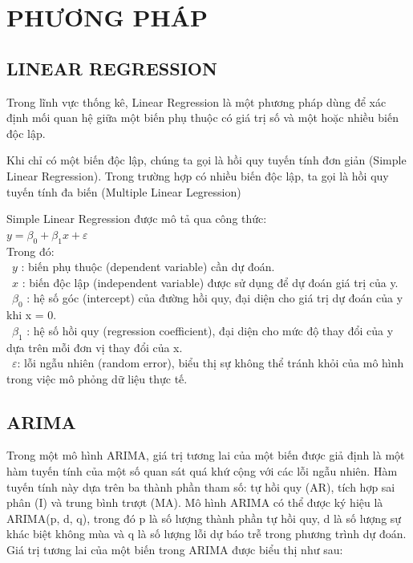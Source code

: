 \documentclass[conference]{IEEEtran}
\begin{document}
\section{PHƯƠNG PHÁP}
\subsection{LINEAR REGRESSION}
Trong lĩnh vực thống kê, Linear Regression là một phương pháp dùng để xác định mối quan hệ giữa một biến phụ thuộc có giá trị số và một hoặc nhiều biến độc lập.

Khi chỉ có một biến độc lập, chúng ta gọi là hồi quy tuyến tính đơn giản (Simple Linear Regression). Trong trường hợp có nhiều biến độc lập, ta gọi là hồi quy tuyến tính đa biến (Multiple Linear Legression)

Simple Linear Regression được mô tả qua công thức: \\

\( y = \beta_0 + \beta_1 x + \varepsilon \) \\

Trong đó:\\
	\indent\textbullet\ \(y\) : biến phụ thuộc (dependent variable) cần dự đoán.\\
	\indent\textbullet\ \(x\) : biến độc lập (independent variable) được sử dụng để dự đoán giá trị của y.\\
        \indent\textbullet\ $\beta_0$ : hệ số góc (intercept) của đường hồi quy, đại diện cho giá trị dự đoán của y khi x = 0.\\
        \indent\textbullet\ $\beta_1$ : hệ số hồi quy (regression coefficient), đại diện cho mức độ thay đổi của y dựa trên mỗi đơn vị thay đổi của x.\\
        \indent\textbullet\ $\varepsilon$: lỗi ngẫu nhiên (random error), biểu thị sự không thể tránh khỏi của mô hình trong việc mô phỏng dữ liệu thực tế.
\subsection{ARIMA}
Trong một mô hình ARIMA, giá trị tương lai của một biến được giả định là một hàm tuyến tính của một số quan sát quá khứ cộng với các lỗi ngẫu nhiên. Hàm tuyến tính này dựa trên ba thành phần tham số: tự hồi quy (AR), tích hợp sai phân (I) và trung bình trượt (MA). Mô hình ARIMA có thể được ký hiệu là ARIMA(p, d, q), trong đó p là số lượng thành phần tự hồi quy, d là số lượng sự khác biệt không mùa và q là số lượng lỗi dự báo trễ trong phương trình dự đoán. Giá trị tương lai của một biến trong ARIMA được biểu thị như sau:\\
\end{document}
